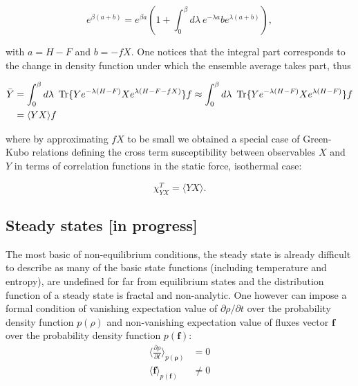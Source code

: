 \documentclass[a4paper,12pt]{article}
\begin{document}
\begin{equation}
  e^{\beta (a+b) }=e^{\beta a} (1+\int_0^{\beta} d\lambda\ e^{-\lambda a} b e^{\lambda (a+b)}),
\end{equation}

with $a=H-F$ and $b=-f X$. One notices that the integral part corresponds to the change in density function under which the ensemble average takes part, thus

\begin{equation}
\begin{aligned}
  \bar{Y} &= \int_0^{\beta} d\lambda\ \Tr\{ Y e^{-\lambda (H - F)} X e^{\lambda (H-F-f X)} \} f \approx  \int_0^{\beta} d\lambda\ \Tr\{ Y e^{-\lambda (H - F)} X e^{\lambda (H-F)} \} f \\
  &= \langle Y X \rangle f
\end{aligned}
\end{equation}

where by approximating $f X$ to be small we obtained a special case of Green-Kubo relations defining the cross term susceptibility between observables $X$ and $Y$ in terms of correlation functions in the static force, isothermal case:

\begin{equation}
  \chi_{YX}^T = \langle Y X \rangle.
\end{equation}

\subsection{Steady states [in progress]}
The most basic of non-equilibrium conditions, the steady state is already difficult to describe as many of the basic state functions (including temperature and entropy), are undefined for far from equilibrium states and the distribution function of a steady state is fractal and non-analytic. %
One however can impose a formal condition of vanishing expectation value of $\partial \rho / \partial t$ over the probability density function $p(\rho)$ and non-vanishing expectation value of fluxes vector $\bm{f}$ over the probability density function $p(\bm{f})$: %
\begin{equation}
\begin{aligned}
\label{SteadyStates}
  \langle \frac{\partial \rho}{\partial t} \rangle_{p(\bm{\rho})} &= 0 \\
  \langle \bm{f} \rangle_{p(\bm{f})} &\neq 0
\end{aligned}
\end{equation}
\end{document}
